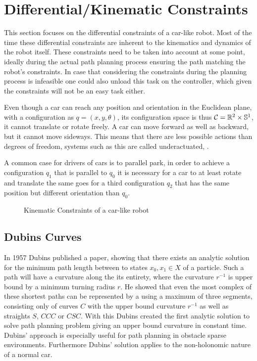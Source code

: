 \section{Differential/Kinematic Constraints}\label{sec:differentialConstraints}
This section focuses on the differential constraints of a car-like robot. Most of the time these differential constraints are inherent to the kinematics and dynamics of the robot itself. These constraints need to be taken into account at some point, ideally during the actual path planning process ensuring the path matching the robot's constraints. In case that considering the constraints during the planning process is infeasible one could also unload this task on the controller, which given the constraints will not be an easy task either. \cite{LaValle.2006}

Even though a car can reach any position and orientation in the Euclidean plane, with a configuration as $q = (x,y,\theta)$, its configuration space is thus $\mathcal{C} = \mathbb{R}^2 \times \mathbb{S}^1$, it cannot translate or rotate freely. A car can move forward as well as backward, but it cannot move sideways. This means that there are less possible actions than degrees of freedom, systems such as this are called underactuated, \cite{LaValle.2006}.

A common case for drivers of cars is to parallel park, in order to achieve a configuration $q_1$ that is parallel to $q_0$ it is necessary for a car to at least rotate and translate the same goes for a third configuration $q_2$ that has the same position but different orientation than $q_0$. \cite{Latombe.1991}

\begin{figure}[h]
    \caption{Kinematic Constraints of a car-like robot}
    \label{fig:kinematicConstraints}
\end{figure}

\subsection{Dubins Curves}
In 1957 Dubins published a paper, showing that there exists an analytic solution for the minimum path length between to states $x_0, x_1 \in X$ of a particle. Such a path will have a curvature along the its entirety, where the curvature $r^{-1}$ is upper bound by a minimum turning radius $r$. He showed that even the most complex of these shortest paths can be represented by a using a maximum of three segments, consisting only of curves $C$ with the upper bound curvature $r^{-1}$ as well as straights $S$, $CCC$ or $CSC$. \cite{Dubins.1957} With this Dubins created the first analytic solution to solve path planning problem giving an upper bound curvature in constant time. Dubins' approach is especially useful for path planning in obstacle sparse environments. Furthermore Dubins' solution applies to the non-holonomic nature of a normal car.


